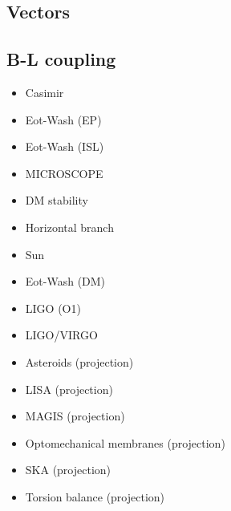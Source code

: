 \documentclass[9pt,twocolumn]{extarticle}
\begin{document}
\begin{mdframed}
\vspace{-1em}
\section{Vectors}\vspace{-0.5em}

\subsection*{B-L coupling}\vspace{-0.5em}
\begin{itemize}\setlength\itemsep{-0.5em}
	\item Casimir~\cite{Bordag:2001qi,Decca:2005qz,Sushkov:2011md}
	\item Eot-Wash (EP)~\cite{Wagner:2012ui}
	\item Eot-Wash (ISL)~\cite{Adelberger:2009zz}
	\item MICROSCOPE~\cite{MICROSCOPE:2022doy}
	\item DM stability~\cite{Chun:2022qcg}
	\item Horizontal branch~\cite{Hardy:2016kme}
	\item Sun~\cite{Hardy:2016kme}
	\item Eot-Wash (DM)~\cite{Shaw:2021gnp}
	\item LIGO (O1)~\cite{LIGOScientific:2021ffg}
	\item LIGO/VIRGO~\cite{LIGOScientific:2021ffg}
	\item Asteroids (projection)~\cite{Fedderke:2022ptm}
	\item LISA (projection)~\cite{Fedderke:2022ptm}
	\item MAGIS (projection)~\cite{MAGIS}
	\item Optomechanical membranes (projection)~\cite{Manley:2020mjq}
	\item SKA (projection)~\cite{Graham:2015ifn}
	\item Torsion balance (projection)~\cite{Graham:2015ifn}
	
\end{itemize}
\end{mdframed}

\newpage 
\end{document}
